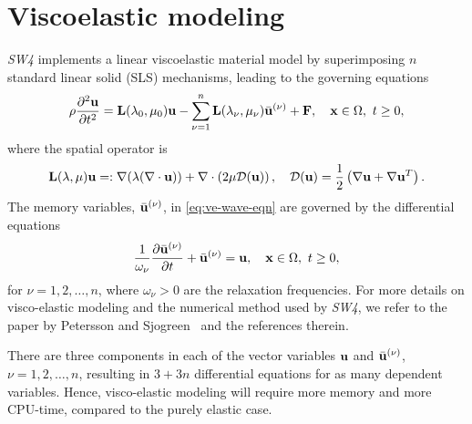 \documentclass[11pt]{report}
\newcommand{\Fb}{{\bf F}}
\newcommand{\Lb}{{\bf L}}
\newcommand{\ub}{{\bf u}}
\newcommand{\xb}{{\bf x}}
\newcommand{\p}{\partial}
\begin{document}
\section{Viscoelastic modeling}\label{sec:ve-model}

\emph{SW4} implements a linear viscoelastic material model by superimposing $n$ standard
linear solid (SLS) mechanisms, leading to the governing equations
\begin{equation}\label{eq:ve-wave-eqn}
{\displaystyle \rho\dfrac{\p^2\ub}{\p t^2} = \Lb(\lambda_0,\mu_0)\ub - \sum_{\nu=1}^n
\Lb(\lambda_{\nu},\mu_\nu)\bar{\ub}^{(\nu)} + \Fb,\quad \xb\in\Omega,\ t\geq 0},
\end{equation}
where the spatial operator is
\begin{equation}\label{eq:spatial-op}
\Lb(\lambda,\mu)\ub =: \nabla(\lambda(\nabla\cdot\ub)) + \nabla\cdot \left(2\mu {\cal
  D}(\ub)\right),\quad {\cal D}(\ub) = \frac{1}{2}\left(\nabla \ub + \nabla\ub^T\right).
\end{equation}
The memory variables, $\bar{\ub}^{(\nu)}$, in \eqref{eq:ve-wave-eqn} are governed by the
differential equations
\begin{equation}\label{eq:ve-ode}
\displaystyle \frac{1}{\omega_\nu}\frac{\p \bar{\ub}^{(\nu)}}{\p t} + \bar{\ub}^{(\nu)} = \ub,\quad
\xb\in\Omega,\ t\geq 0,
\end{equation}
for $\nu=1,2,\ldots,n$, where $\omega_\nu>0$ are the relaxation frequencies. For more details on
visco-elastic modeling and the numerical method used by \emph{SW4}, we refer to the paper by
Petersson and Sjogreen~\cite{PetSjo-10b} and the references therein.

There are three components in each of the vector variables $\ub$ and $\bar{\ub}^{(\nu)}$,
$\nu=1,2,\ldots,n$, resulting in $3+3n$ differential equations for as many dependent
variables. Hence, visco-elastic modeling will require more memory and more CPU-time, compared to the
purely elastic case.
\end{document}
